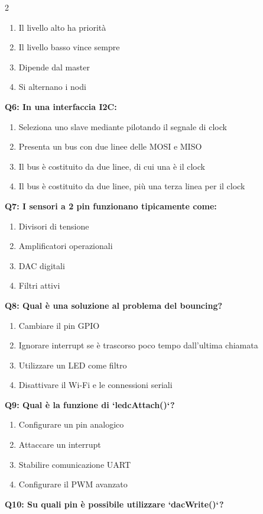\documentclass[10pt]{article}
\begin{document}
\begin{multicols}{2}
\begin{enumerate}[label=\arabic*.]
\item Il livello alto ha priorità
\item Il livello basso vince sempre
\item Dipende dal master
\item Si alternano i nodi
\end{enumerate}
\textbf{Q6: In una interfaccia I2C:}

\begin{enumerate}[label=\arabic*.]
\item Seleziona uno slave mediante pilotando il segnale di clock
\item Presenta un bus con due linee delle MOSI e MISO
\item Il bus è costituito da due linee, di cui una è il clock
\item Il bus è costituito da due linee, più una terza linea per il clock
\end{enumerate}
\textbf{Q7: I sensori a 2 pin funzionano tipicamente come:}

\begin{enumerate}[label=\arabic*.]
\item Divisori di tensione
\item Amplificatori operazionali
\item DAC digitali
\item Filtri attivi
\end{enumerate}
\textbf{Q8: Qual è una soluzione al problema del bouncing?}

\begin{enumerate}[label=\arabic*.]
\item Cambiare il pin GPIO
\item Ignorare interrupt se è trascorso poco tempo dall'ultima chiamata
\item Utilizzare un LED come filtro
\item Disattivare il Wi-Fi e le connessioni seriali
\end{enumerate}
\textbf{Q9: Qual è la funzione di `ledcAttach()`?}

\begin{enumerate}[label=\arabic*.]
\item Configurare un pin analogico
\item Attaccare un interrupt
\item Stabilire comunicazione UART
\item Configurare il PWM avanzato
\end{enumerate}
\textbf{Q10: Su quali pin è possibile utilizzare `dacWrite()`?}


\end{multicols}
\end{document}
